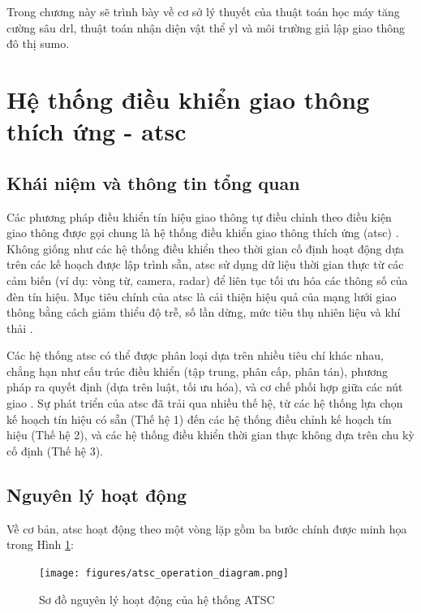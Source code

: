 Trong chương này sẽ trình bày về cơ sở lý thuyết của thuật toán học máy tăng
cường sâu \ac{drl}, thuật toán nhận diện vật thể \ac{yl} và môi trường giả lập giao
thông đô thị \ac{sumo}.

\section{Hệ thống điều khiển giao thông thích ứng - \ac{atsc}}
\subsection{Khái niệm và thông tin tổng quan}
Các phương pháp điều khiển tín hiệu giao thông tự điều chỉnh theo điều kiện giao
thông được gọi chung là hệ thống điều khiển giao thông thích ứng (\ac{atsc}) \cite{Shams2023}.
Không giống như các hệ thống điều khiển theo thời gian cố định hoạt động dựa
trên các kế hoạch được lập trình sẵn, \ac{atsc} sử dụng dữ liệu thời gian thực
từ các cảm biến (ví dụ: vòng từ, camera, radar) để liên tục tối ưu hóa các thông
số của đèn tín hiệu. Mục tiêu chính của \ac{atsc} là cải thiện hiệu quả của mạng
lưới giao thông bằng cách giảm thiểu độ trễ, số lần dừng, mức tiêu thụ nhiên liệu
và khí thải \cite{Stevanovic2010}.

Các hệ thống \ac{atsc} có thể được phân loại dựa trên nhiều tiêu chí khác nhau, chẳng
hạn như cấu trúc điều khiển (tập trung, phân cấp, phân tán), phương pháp ra
quyết định (dựa trên luật, tối ưu hóa), và cơ chế phối hợp giữa các nút giao
\cite{Shams2023}. Sự phát triển của \ac{atsc} đã trải qua nhiều thế hệ, từ các hệ
thống lựa chọn kế hoạch tín hiệu có sẵn (Thế hệ 1) đến các hệ thống điều chỉnh kế
hoạch tín hiệu (Thế hệ 2), và các hệ thống điều khiển thời gian thực không dựa
trên chu kỳ cố định (Thế hệ 3).

\subsection{Nguyên lý hoạt động}
Về cơ bản, \ac{atsc} hoạt động theo một vòng lặp gồm ba bước chính được minh họa trong Hình \ref{fig:atsc_operation}:

\begin{figure}[!htp]
    \centering
    \texttt{[image: figures/atsc\_operation\_diagram.png]}
    \caption{Sơ đồ nguyên lý hoạt động của hệ thống ATSC}
    \label{fig:atsc_operation}
\end{figure}


